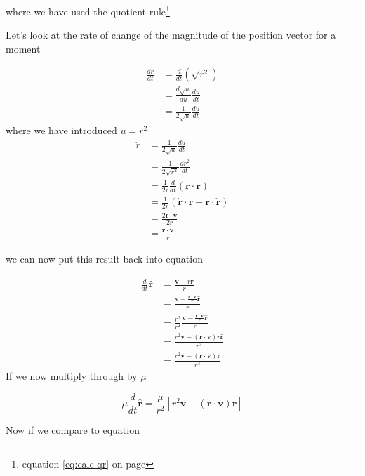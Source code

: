 where we have used the quotient rule\footnote{equation \ref{eq:calc-qr} on page \pageref{eq:calc-qr}}

Let's look at the rate of change of the magnitude of the position vector for a moment

\begin{align}
\frac{dr}{dt} &= \frac{d}{dt}(\sqrt{r^2})\nonumber \\
&=\frac{d \sqrt{u}}{du}\frac{du}{dt}\nonumber \\
&=\frac{1}{2\sqrt{u}}\frac{du}{dt}
\end{align}
where we have introduced $u=r^2$
\begin{align}
\dot{r}&= \frac{1}{2\sqrt{u}}\frac{du}{dt} \nonumber \\
&= \frac{1}{2\sqrt{r^2}}\frac{dr^2}{dt} \nonumber \\
&= \frac{1}{2r}\frac{d}{dt}(\mathbf{r}\cdot\mathbf{r}) \nonumber \\
&=\frac{1}{2r}(\dot{\mathbf{r}}\cdot\mathbf{r} + \mathbf{r}\cdot\dot{\mathbf{r}})\nonumber \\
&=\frac{2 \mathbf{r} \cdot \mathbf{v}}{2r} \nonumber \\
&=\frac{\mathbf{r} \cdot \mathbf{v}}{r} \label{eq:gravity6}
\end{align}

we can now put this result back into equation 

\begin{align}
\frac{d}{dt}\hat{\mathbf{r}} &=\frac {{\mathbf{v}}-\dot{r}\hat{\mathbf{r}}}{r} \nonumber \\
 &=\frac {{\mathbf{v}}-\frac{\mathbf{r} \cdot \mathbf{v}}{r}\hat{\mathbf{r}}}{r} \nonumber \\
 &= \frac{r^2}{r^2} \frac {{\mathbf{v}}-\frac{\mathbf{r} \cdot \mathbf{v}}{r}\hat{\mathbf{r}}}{r} \nonumber \\
&= \frac{{r^2\mathbf{v}}-(\mathbf{r} \cdot \mathbf{v})r\hat{\mathbf{r}}}{r^3} \nonumber \\
&= \frac{{r^2\mathbf{v}}-(\mathbf{r} \cdot \mathbf{v})\mathbf{r}}{r^3}
\end{align}
If we now multiply through by $\mu$

\begin{equation}
\mu \frac{d}{dt}\hat{\mathbf{r}} = \frac{\mu}{r^2}\left[{r^2\mathbf{v}}-(\mathbf{r} \cdot \mathbf{v})\mathbf{r}\right]
\end{equation}

Now if we compare to equation 

